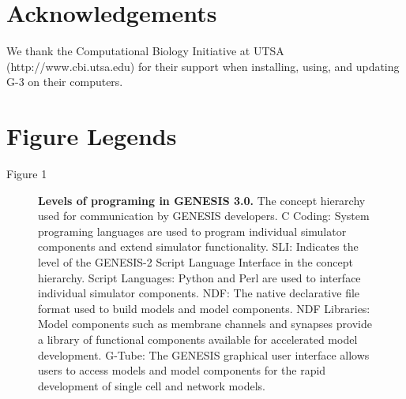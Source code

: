 \documentclass[10pt]{article}
\begin{document}
\section*{\LARGE Acknowledgements}

We thank the Computational Biology Initiative at UTSA (http://www.cbi.utsa.edu) for their support when installing, using, and updating G-3 on their computers.



\newpage 



\newpage

\section*{\LARGE Figure Legends}

Figure 1

\begin{figure}[ht]
\begin{center}
\end{center}
\caption{
{\bf Levels of programing in GENESIS 3.0.} The concept hierarchy used for communication by GENESIS developers. C Coding: System programing languages are used to program individual simulator components and extend simulator functionality. SLI: Indicates the level of the GENESIS-2 Script Language Interface in the concept hierarchy. Script Languages: Python and Perl are used to interface individual simulator components. NDF: The native declarative file format used to build models and model components. NDF Libraries: Model components such as membrane channels and synapses provide a library of functional components available for accelerated model development. G-Tube: The GENESIS graphical user interface allows users to access models and model components for the rapid development of single cell and network models.
}
\label{fig:g3-interfacing}
\end{figure}
\end{document}

